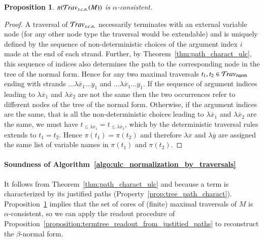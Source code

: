 \documentclass{elsarticle}
\theoremstyle{plain}
\newtheorem{proposition}[theorem]{Proposition}
\theoremstyle{definition}
\newcommand{\normalizing}{{\sf norm}}
\newcommand{\travsetnorm}{\travset_\normalizing} %
\newcommand{\travsetscn}{\travset_{s.c.n.}} %
\newcommand{\travulc}{\travset}
\def\coresymbol{\pi} %
\newcommand{\core}[1]{\coresymbol(#1)} %
\newcommand\pathset{{\mathcal{P}aths}} %
\begin{document}
\begin{proposition}
    \label{prop:core_travsetnorm_alpha_consistent}
    $\core{\travsetscn(M)}$ is $\alpha$-consistent.
\end{proposition}
\begin{proof}
A traversal of $\travsetscn$
necessarily terminates with an external variable node (for any other node type the traversal would be extendable) and
is uniquely defined by the sequence of non-deterministic choices of the argument index $i$ made at the end of each strand. Further, by Theorem~\ref{thm:path_charact_ulc}, this sequence of indices also determines the path to the corresponding node in the tree of the normal form.
Hence for any two maximal traversals $t_1,t_2 \in \travsetnorm$
ending with strands $\ldots  \lambda\overline{x}_1 \ldots y_1$ and
$\ldots \lambda\overline{x}_1 \ldots y_1$.
If the sequence of argument indices leading to $\lambda\overline{x}_1$ and $\lambda\overline{x}_2$ are not the same then the two occurrences refer to different nodes of the tree of the normal form.
Otherwise, if the argument indices are the same, that is all the non-deterministic choices leading to $\lambda\overline{x}_1$ and $\lambda\overline{x}_2$ are the same, we must have $t_{\leq \lambda\overline{x}_1} = t_{\leq \lambda\overline{x}_2}$, which by the deterministic
traversal rules extends to $t_1 = t_2$.
Hence $\core{t_1} = \core{t_2}$ and therefore $\lambda\overline{x}$
and $\lambda\overline{y}$ are assigned the same list of variable names in
$\core{t_1}$ and $\core{t_2}$.
\end{proof}

\paragraph{Soundness of Algorithm~\ref{algo:ulc_normalization_by_traversals}} It follows from Theorem~\ref{thm:path_charact_ulc} and because a term is  characterized by its justified paths (Property~\ref{prop:tree_path_charact}).
Proposition~\ref{prop:core_travsetnorm_alpha_consistent}
implies that
the set of cores of (finite) maximal traversals of $M$
is $\alpha$-consistent, so we can
apply the readout procedure of Proposition~\ref{proposition:termtree_readout_from_justitied_paths} to
reconstruct the $\beta$-normal form.

\end{document}
